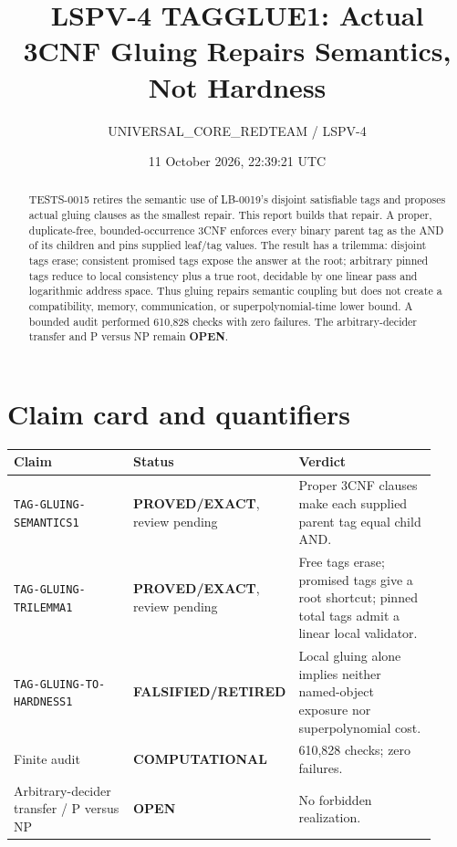 \documentclass[11pt]{article}
\title{LSPV-4 TAGGLUE1: Actual 3CNF Gluing Repairs Semantics, Not Hardness}
\author{UNIVERSAL\_CORE\_REDTEAM / LSPV-4}
\date{11 October 2026, 22:39:21 UTC}
\newcommand{\EXACT}{\textbf{PROVED/EXACT}}
\newcommand{\COMP}{\textbf{COMPUTATIONAL}}
\newcommand{\OPEN}{\textbf{OPEN}}
\newcommand{\RETIRED}{\textbf{FALSIFIED/RETIRED}}
\begin{document}
\maketitle

\begin{abstract}
TESTS-0015 retires the semantic use of LB-0019's disjoint satisfiable tags
and proposes actual gluing clauses as the smallest repair.  This report builds
that repair.  A proper, duplicate-free, bounded-occurrence 3CNF enforces every
binary parent tag as the AND of its children and pins supplied leaf/tag values.
The result has a trilemma: disjoint tags erase; consistent promised tags expose
the answer at the root; arbitrary pinned tags reduce to local consistency plus
a true root, decidable by one linear pass and logarithmic address space.
Thus gluing repairs semantic coupling but does not create a compatibility,
memory, communication, or superpolynomial-time lower bound.  A bounded audit
performed 610,828 checks with zero failures.  The arbitrary-decider transfer
and P versus NP remain \OPEN.
\end{abstract}

\section{Claim card and quantifiers}

\begin{center}\small
\begin{tabular}{p{0.35\linewidth}p{0.19\linewidth}p{0.38\linewidth}}
\toprule
Claim & Status & Verdict\\ \midrule
\texttt{TAG-GLUING-SEMANTICS1} & \EXACT, review pending &
Proper 3CNF clauses make each supplied parent tag equal child AND.\\
\texttt{TAG-GLUING-TRILEMMA1} & \EXACT, review pending &
Free tags erase; promised tags give a root shortcut; pinned total tags admit
a linear local validator.\\
\texttt{TAG-GLUING-TO-HARDNESS1} & \RETIRED &
Local gluing alone implies neither named-object exposure nor superpolynomial
cost.\\
Finite audit & \COMP & 610,828 checks; zero failures.\\
Arbitrary-decider transfer / P versus NP & \OPEN & No forbidden realization.\\
\bottomrule
\end{tabular}
\end{center}
\end{document}
